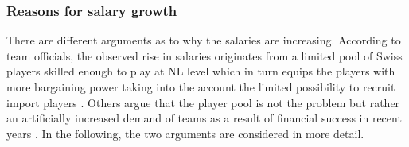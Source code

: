 \documentclass[12pt, a4paper]{article}
\begin{document}
\subsubsection{Reasons for salary growth}
\label{salaryGrowthReasons}

There are different arguments as to why the salaries are increasing. According to team officials, the observed rise in salaries originates from a limited pool of Swiss players skilled enough to play at NL level which in turn equips the players with more bargaining power taking into the account the limited possibility to recruit import players \citep[see][]{noauthor_zu_2018}. Others argue that the player pool is not the problem but rather an artificially increased demand of teams as a result of financial success in recent years \citep[see][]{roth_wegen_2020}. In the following, the two arguments are considered in more detail. 
\end{document}
